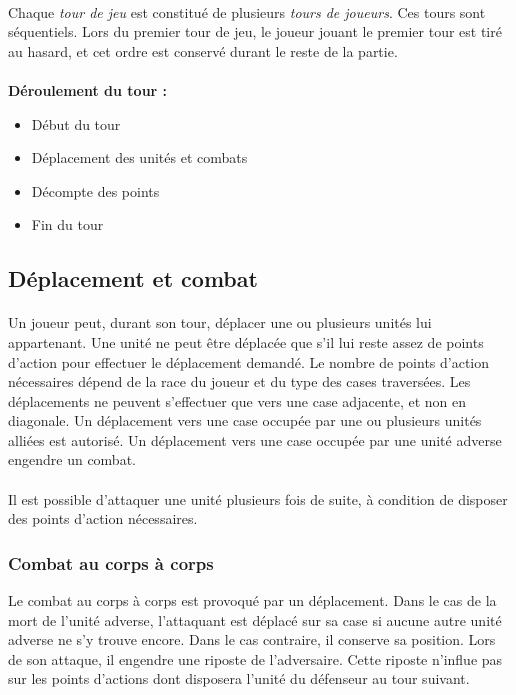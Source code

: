 \documentclass[a4paper]{article}
\begin{document}
\paragraph{}
Chaque \textit{tour de jeu} est constitué de plusieurs \textit{tours de joueurs}. Ces tours sont séquentiels. Lors du premier tour de jeu, le joueur jouant le premier tour est tiré au hasard, et cet ordre est conservé durant le reste de la partie.

\paragraph{}
\textbf{Déroulement du tour : }
\begin{itemize}
    \item Début du tour
    \item Déplacement des unités et combats
    \item Décompte des points
    \item Fin du tour
\end{itemize}

\subsection{Déplacement et combat}
\paragraph{}
Un joueur peut, durant son tour, déplacer une ou plusieurs unités lui appartenant. Une unité ne peut être déplacée que s'il lui reste assez de points d'action pour effectuer le déplacement demandé. Le nombre de points d'action nécessaires dépend de la race du joueur et du type des cases traversées. Les déplacements ne peuvent s'effectuer que vers une case adjacente, et non en diagonale. Un déplacement vers une case occupée par une ou plusieurs unités alliées est autorisé. Un déplacement vers une case occupée par une unité adverse engendre un combat.

\paragraph{}
Il est possible d'attaquer une unité plusieurs fois de suite, à condition de disposer des points d'action nécessaires.

\subsubsection{Combat au corps à corps}
Le combat au corps à corps est provoqué par un déplacement. Dans le cas de la mort de l'unité adverse, l'attaquant est déplacé sur sa case si aucune autre unité adverse ne s'y trouve encore. Dans le cas contraire, il conserve sa position.
Lors de son attaque, il engendre une riposte de l'adversaire. Cette riposte n'influe pas sur les points d'actions dont disposera l'unité du défenseur au tour suivant.
\end{document}

